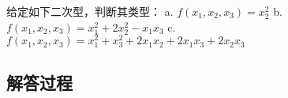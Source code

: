 \begin{example}[二次型分类]
    给定如下二次型，判断其类型：  
    a. \( f(x_1, x_2, x_3) = x_2^2 \)  
    b. \( f(x_1, x_2, x_3) = x_1^2 + 2x_2^2 - x_1x_3 \)  
    c. \( f(x_1, x_2, x_3) = x_1^2 + x_3^2 + 2x_1x_2 + 2x_1x_3 + 2x_2x_3 \)
    \end{example}
    
    \subsection*{解答过程}
    
